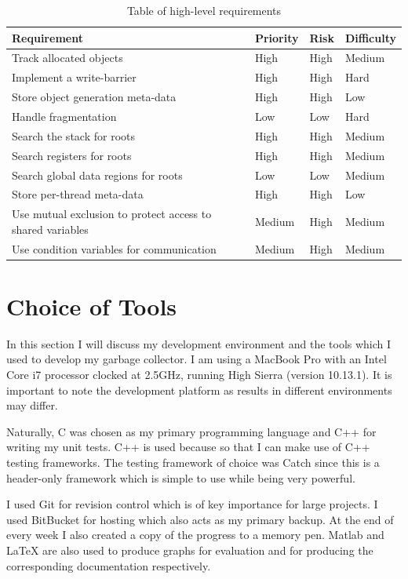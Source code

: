 \documentclass[../diss.tex]{subfiles}
\begin{document}
\begin{table}
    \centering
    \begin{tabular}{| l | l | l | l |}
        \hline
         \bf{Requirement} & \bf{Priority} & \bf{Risk} & \bf{Difficulty} \\ \hline
         Track allocated objects & High & High & Medium \\ \hline
         Implement a write-barrier & High & High & Hard \\ \hline
         Store object generation meta-data & High & High & Low \\ \hline
         Handle fragmentation & Low & Low & Hard \\ \hline
         Search the stack for roots & High & High & Medium \\ \hline
         Search registers for roots & High & High & Medium \\ \hline
         Search global data regions for roots & Low & Low & Medium \\ \hline
         Store per-thread meta-data & High & High & Low \\ \hline
         Use mutual exclusion to protect access to shared variables & Medium & High & Medium \\ \hline
         Use condition variables for communication & Medium & High & Medium \\ \hline
    \end{tabular}
    \caption{Table of high-level requirements}
    \label{tab:requirements}
\end{table}

\section{Choice of Tools} \label{sec:tools}

In this section I will discuss my development environment and the tools which I used to develop my garbage collector. I am using a MacBook Pro with an Intel Core i7 processor clocked at 2.5GHz, running High Sierra (version 10.13.1). It is important to note the development platform as results in different environments may differ.

Naturally, C was chosen as my primary programming language and C++ for writing my unit tests. C++ is used because so that I can make use of C++ testing frameworks. The testing framework of choice was Catch since this is a header-only framework which is simple to use while being very powerful. 

I used Git for revision control which is of key importance for large projects. I used BitBucket for hosting which also acts as my primary backup. At the end of every week I also created a copy of the progress to a memory pen. Matlab and LaTeX are also used to produce graphs for evaluation and for producing the corresponding documentation respectively.
\end{document}
